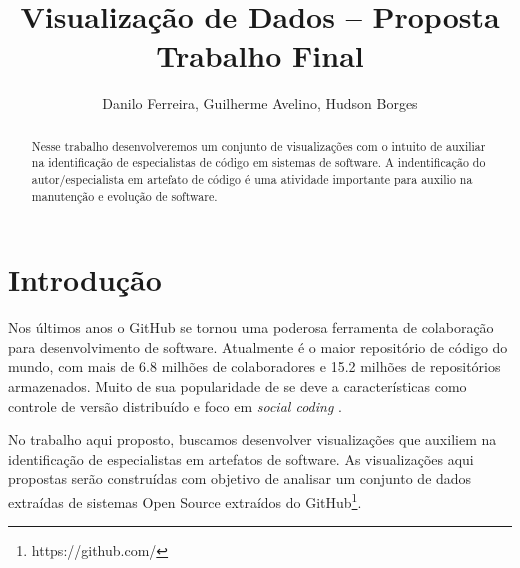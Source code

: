 \documentclass[12pt]{article}
\title{Visualização de Dados -- Proposta Trabalho Final}
\author{Danilo Ferreira, Guilherme Avelino, Hudson Borges}  %
\begin{document}
\maketitle

\begin{abstract}
Nesse trabalho desenvolveremos um conjunto de visualizações com o intuito de auxiliar na identificação de especialistas de código em sistemas de software. A indentificação do autor/especialista em artefato de código é uma atividade importante   para auxilio na manutenção e evolução de software.\\
\end{abstract}


\section{Introdução}

Nos últimos anos o GitHub se tornou uma poderosa ferramenta de colaboração para desenvolvimento de software. Atualmente é o maior repositório de código do mundo, com mais de 6.8 milhões de colaboradores e 15.2 milhões de repositórios armazenados. Muito de sua popularidade de se deve a características como controle de versão distribuído e foco em \textit{social coding} \cite{Dabbish2012}. 

No trabalho aqui proposto, buscamos desenvolver visualizações que auxiliem na identificação de especialistas em artefatos de software. As visualizações aqui propostas serão construídas com objetivo de analisar um conjunto de dados extraídas de sistemas Open Source extraídos do GitHub\footnote{https://github.com/}.
\end{document}
